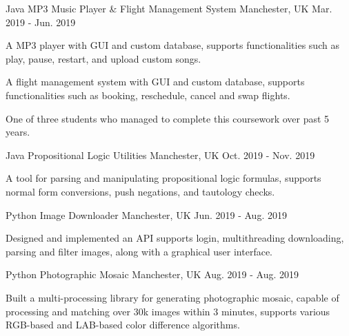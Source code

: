 \begin{cventries}
\cventry
  {Java} %
  {MP3 Music Player \& Flight Management System} %
  {Manchester, UK} %
  {Mar. 2019 - Jun. 2019} %
  {
    \begin{cvitems} %
      \item {A MP3 player with GUI and custom database, supports functionalities such as play, pause, restart, and upload custom songs.}
      \item {A flight management system with GUI and custom database, supports functionalities such as booking, reschedule, cancel and swap flights.}
      \item {One of three students who managed to complete this coursework over past 5 years.}
    \end{cvitems}
  }

  \cventry
    {Java} %
    {Propositional Logic Utilities} %
    {Manchester, UK} %
    {Oct. 2019 - Nov. 2019} %
    {
      \begin{cvitems} %
        \item {A tool for parsing and manipulating propositional logic formulas, supports normal form conversions, push negations, and tautology checks.}
      \end{cvitems}
    }

  \cventry
    {Python} %
    {Image Downloader} %
    {Manchester, UK} %
    {Jun. 2019 - Aug. 2019} %
    {
      \begin{cvitems} %
        \item {Designed and implemented an API supports login, multithreading downloading, parsing and filter images, along with a graphical user interface.}
      \end{cvitems}
    }
  
    
  \cventry
  {Python} %
  {Photographic Mosaic} %
  {Manchester, UK} %
  {Aug. 2019 - Aug. 2019} %
  {
    \begin{cvitems} %
      \item {Built a multi-processing library for generating photographic mosaic, capable of processing and matching over 30k images within 3 minutes, supports various RGB-based and LAB-based color difference algorithms.}
    \end{cvitems}
  }


\end{cventries}
